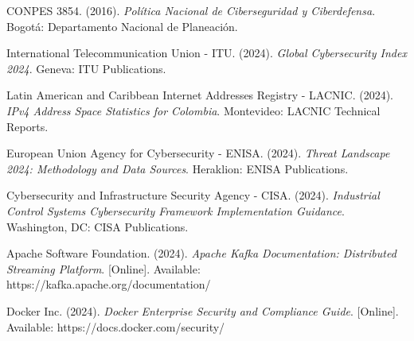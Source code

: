 \begin{thebibliography}{50}
CONPES 3854. (2016). \textit{Política Nacional de Ciberseguridad y Ciberdefensa}. Bogotá: Departamento Nacional de Planeación.

International Telecommunication Union - ITU. (2024). \textit{Global Cybersecurity Index 2024}. Geneva: ITU Publications.

Latin American and Caribbean Internet Addresses Registry - LACNIC. (2024). \textit{IPv4 Address Space Statistics for Colombia}. Montevideo: LACNIC Technical Reports.

European Union Agency for Cybersecurity - ENISA. (2024). \textit{Threat Landscape 2024: Methodology and Data Sources}. Heraklion: ENISA Publications.

Cybersecurity and Infrastructure Security Agency - CISA. (2024). \textit{Industrial Control Systems Cybersecurity Framework Implementation Guidance}. Washington, DC: CISA Publications.

Apache Software Foundation. (2024). \textit{Apache Kafka Documentation: Distributed Streaming Platform}. [Online]. Available: https://kafka.apache.org/documentation/

Docker Inc. (2024). \textit{Docker Enterprise Security and Compliance Guide}. [Online]. Available: https://docs.docker.com/security/

\end{thebibliography}
